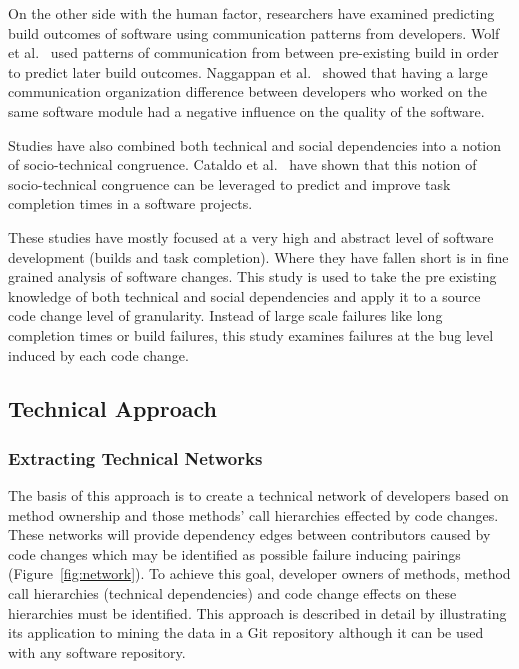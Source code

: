 On the other side with the human factor, researchers have examined predicting build outcomes of software
using communication patterns from developers. Wolf et al.~\cite{5070503} used patterns of communication from between
pre-existing build in order to predict later build outcomes. Naggappan et al.~\cite{nagappan08} showed that having a large
communication organization difference between developers who worked on the same software module had
a negative influence on the quality of the software.

Studies have also combined both technical and social dependencies into a notion of socio-technical congruence.
Cataldo et al.~\cite{Cataldo:2006:ICR} have shown that this notion of socio-technical congruence can be leveraged to predict
and improve task completion times in a software projects.

These studies have mostly focused at a very high and abstract level of software development (builds and task completion).
Where they have fallen short is in fine grained analysis of software changes. This study is used to take the
pre existing knowledge of both technical and social dependencies and apply it to a source code change level of
granularity. Instead of large scale failures like long completion times or build failures, this study examines failures
at the bug level induced by each code change.


\subsection{Technical Approach}

\subsubsection{Extracting Technical Networks}
The basis of this approach is to create a technical network of developers based on method ownership
and those methods' call hierarchies effected by code changes. These networks will provide
dependency edges between contributors caused by code changes which may be 
identified as possible failure inducing pairings (Figure~\ref{fig:network}). To achieve this goal,
developer owners of methods, method call hierarchies (technical
dependencies) and code change effects on these hierarchies must be identified.
This approach is described in detail by illustrating its application to mining the data in a Git
repository although it can be used with any software repository.


